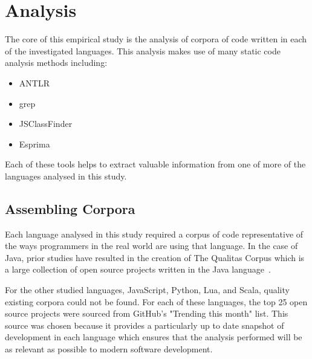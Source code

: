 \chapter{Analysis}\label{C:analysis} 
The core of this empirical study is the analysis of corpora of code written in each of the investigated languages. This analysis makes use of many static code analysis methods including:
\begin{itemize}
	\item ANTLR
	\item grep
	\item JSClassFinder
	\item Esprima
\end{itemize}
Each of these tools helps to extract valuable information from one of more of the languages analysed in this study.

\section{Assembling Corpora}
Each language analysed in this study required a corpus of code representative of the ways programmers in the real world are using that language. In the case of Java, prior studies have resulted in the creation of The Qualitas Corpus which is a large collection of open source projects written in the Java language~\cite{QualitasCorpus}. \newline

For the other studied languages, JavaScript, Python, Lua, and Scala, quality existing corpora could not be found. For each of these languages, the top 25 open source projects were sourced from GitHub's "Trending this month" list. This source was chosen because it provides a particularly up to date snapshot of development in each language which ensures that the analysis performed will be as relevant as possible to modern software development.

